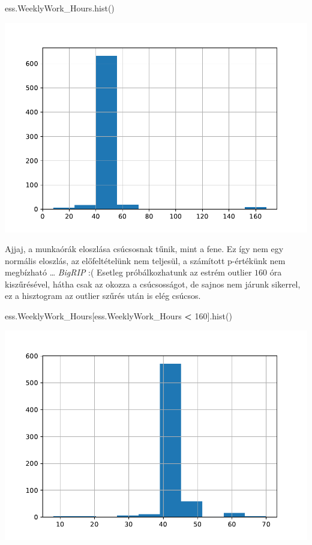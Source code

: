 \documentclass[
]{book}
\newenvironment{Shaded}{\begin{snugshade}}{\end{snugshade}}
\newcommand{\DecValTok}[1]{\textcolor[rgb]{0.00,0.00,0.81}{#1}}
\newcommand{\NormalTok}[1]{#1}
\newcommand{\OperatorTok}[1]{\textcolor[rgb]{0.81,0.36,0.00}{\textbf{#1}}}
\begin{document}
\begin{Shaded}
\begin{Highlighting}[]
\NormalTok{ess.WeeklyWork\_Hours.hist()}
\end{Highlighting}
\end{Shaded}

\includegraphics{_main_files/figure-latex/unnamed-chunk-357-29.pdf}

Ajjaj, a munkaórák eloszlása csúcsosnak tűnik, mint a fene. Ez így nem egy normális eloszlás, az előfeltételünk nem teljesül, a számított p-értékünk nem megbízható \ldots{} \emph{BigRIP} :(
Esetleg próbálkozhatunk az estrém outlier \(160\) óra kiszűrésével, hátha csak az okozza a csúcsosságot, de sajnos nem járunk sikerrel, ez a hisztogram az outlier szűrés után is elég csúcsos.

\begin{Shaded}
\begin{Highlighting}[]
\NormalTok{ess.WeeklyWork\_Hours[ess.WeeklyWork\_Hours }\OperatorTok{\textless{}} \DecValTok{160}\NormalTok{].hist()}
\end{Highlighting}
\end{Shaded}

\includegraphics{_main_files/figure-latex/unnamed-chunk-358-31.pdf}
\end{document}
